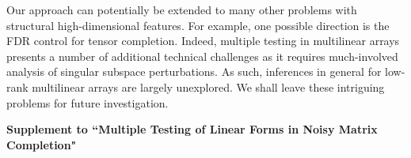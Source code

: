 \documentclass[12pt]{article}
\theoremstyle{plain}
\begin{document}
\begin{sloppypar}
Our approach can potentially be extended to many other problems with structural high-dimensional features. For example, one possible direction is the FDR control for tensor completion. Indeed, multiple testing in multilinear arrays presents a number of additional technical challenges as it requires much-involved analysis of singular subspace perturbations. As such, inferences in general for low-rank multilinear arrays are largely unexplored. We shall leave these intriguing problems for future investigation.

\end{sloppypar}





\newpage

\appendix
\begin{center}
{\bf\LARGE Supplement to ``Multiple Testing of Linear Forms in Noisy Matrix Completion"}
\end{center}
\smallskip
\end{document}
